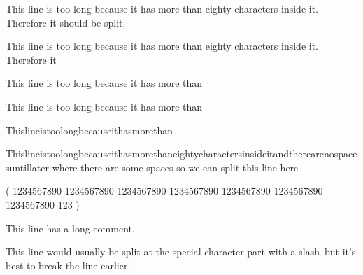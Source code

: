 \documentclass{article}
\begin{document}
This line is too long because it has more than eighty characters inside it.
Therefore it should be split.

This line is too long because it has more than eighty characters inside it.
Therefore it %

This line is too long because it has more than %

This line is too long because it has more than%

Thislineistoolongbecauseithasmorethan%

Thislineistoolongbecauseithasmorethaneightycharactersinsideitandtherearenospacesuntillater
where there are some spaces so we can split this line here

(
  1234567890 1234567890 1234567890 1234567890 1234567890 1234567890 1234567890
  123
)

This line has a long comment. %


This line would usually be split at the special character part with a
slash\ but it's best to break the line earlier.
\end{document}
